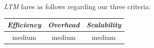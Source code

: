 %
%
%
%
%
\emph{LTM} fares as follows regarding our three  criteria:
\begin{center}
{\footnotesize
\begin{tabular}{ccc}
\emph{Efficiency} & \emph{Overhead} & \emph{Scalability} \\
\hline
medium &
%
medium &
%
medium
\end{tabular}
}
\end{center}

